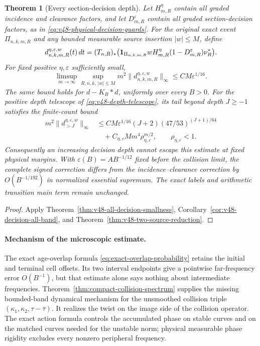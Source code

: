 \documentclass[11pt,reqno]{amsart}
\numberwithin{equation}{section}
\newtheorem{leadtheorem}{Theorem}
\theoremstyle{definition}\newtheorem{definition}[theorem]{Definition}
\theoremstyle{remark}\newtheorem{remark}[theorem]{Remark}
\begin{document}
\begin{leadtheorem}[Every section-decision depth]
\label{thm:intro-v48-all-decisions}
Let $H_{m,R}^{\eta}$ contain all graded incidence and clearance factors,
and let $D_{m,R}^{\varepsilon}$ contain all graded section-decision
factors, as in \eqref{eq:v48-physical-decision-guards}. For the original
exact event $\Pi_{n,k,m,R}$ and any bounded measurable source insertion
$|w|\le M$, define
\[
 d^{\eta,\varepsilon,w}_{n,k,m,R}(t)\,dt
 =(T_{n,R})_*\bigl(\mathbf1_{\Pi_{n,k,m,R}}wH_{m,R}^{\eta}
                        (1-D_{m,R}^{\varepsilon})\nu_R^*\bigr).
\]
For fixed positive $\eta,\varepsilon$ sufficiently small,
\[
 \limsup_{m\to\infty}\sup_{R,n,k,\,|w|\le M}
             m^2\|d^{\eta,\varepsilon,w}_{n,k,m,R}\|_\infty
                           \le CM\varepsilon^{1/16}.
\]
The same bound holds for $d-K_B*d$, uniformly over every $B>0$.
For the positive depth telescope of \eqref{eq:v48-depth-telescope},
its tail beyond depth $J\ge-1$ satisfies the finite-count bound
\begin{align*}
 m^2\|d_{>J}^{\eta,\varepsilon,w}\|_\infty
 &\le CM\varepsilon^{1/16}(J+2)(47/53)^{(J+1)/64}\\
 &\quad+C_{\eta,\varepsilon}M m^4\rho_{\eta,\varepsilon}^{m/2},
                      \qquad \rho_{\eta,\varepsilon}<1.
\end{align*}
Consequently an increasing decision depth cannot escape this estimate
at fixed physical margins. With $\varepsilon(B)=AB^{-1/12}$ fixed
before the collision limit, the complete signed correction differs
from the incidence--clearance correction by $O(B^{-1/192})$ in
normalized essential supremum. The exact labels and arithmetic
transition main term remain unchanged.
\end{leadtheorem}
\begin{proof}
Apply Theorem~\ref{thm:v48-all-decision-smallness},
Corollary~\ref{cor:v48-decision-all-band}, and
Theorem~\ref{thm:v48-two-source-reduction}.
\end{proof}

\paragraph{Mechanism of the microscopic estimate.}
The exact age-overlap formula
\eqref{eq:exact-overlap-probability} retains the initial and terminal
cell offsets. Its two interval endpoints give a pointwise far-frequency
error $O(B^{-1})$, but that estimate alone says nothing about intermediate
frequencies. Theorem~\ref{thm:compact-collision-spectrum} supplies the
missing bounded-band dynamical mechanism for the unsmoothed collision
triple $(\kappa_1,\kappa_2,\tau-\bar\tau)$. It realizes the twist on
the image side of the collision operator. The exact action formula
controls the accumulated phase on stable curves and on the matched
curves needed for the unstable norm; physical measurable phase rigidity
excludes every nonzero peripheral frequency.
\end{document}
